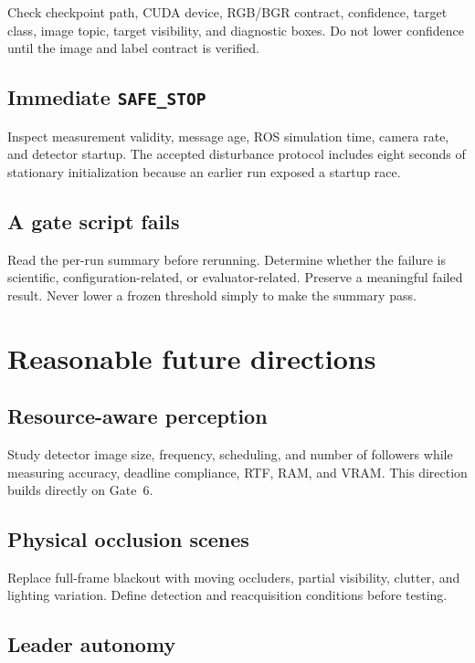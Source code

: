 \documentclass[11pt,oneside,openany]{book}
\newcommand{\state}[1]{\texttt{#1}}
\begin{document}
Check checkpoint path, CUDA device, RGB/BGR contract, confidence, target class, image topic, target visibility, and diagnostic boxes. Do not lower confidence until the image and label contract is verified.

\section{Immediate \state{SAFE\_STOP}}

Inspect measurement validity, message age, ROS simulation time, camera rate, and detector startup. The accepted disturbance protocol includes eight seconds of stationary initialization because an earlier run exposed a startup race.

\section{A gate script fails}

Read the per-run summary before rerunning. Determine whether the failure is scientific, configuration-related, or evaluator-related. Preserve a meaningful failed result. Never lower a frozen threshold simply to make the summary pass.

\chapter{Reasonable future directions}

\section{Resource-aware perception}

Study detector image size, frequency, scheduling, and number of followers while measuring accuracy, deadline compliance, RTF, RAM, and VRAM. This direction builds directly on Gate~6.

\section{Physical occlusion scenes}

Replace full-frame blackout with moving occluders, partial visibility, clutter, and lighting variation. Define detection and reacquisition conditions before testing.

\section{Leader autonomy}
\end{document}
